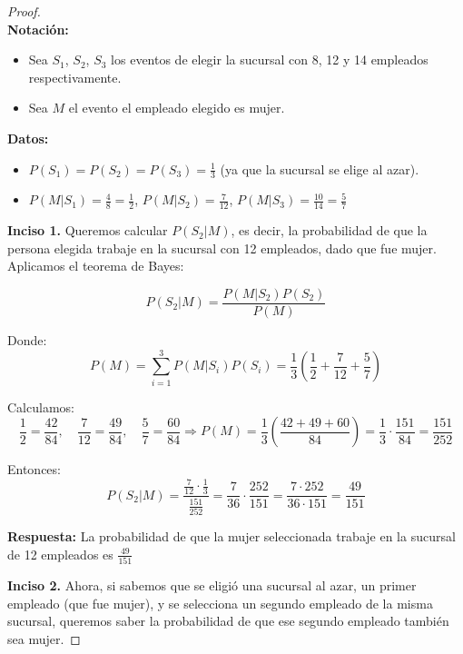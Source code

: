 \documentclass[11pt,letterpaper]{article}
\begin{document}
\begin{proof}\,\\
	\textbf{Notación:}
	\begin{itemize}
	    \item Sea $S_1$, $S_2$, $S_3$ los eventos de elegir la sucursal con 8, 12 y 14 empleados respectivamente.
	    \item Sea $M$ el evento el empleado elegido es mujer.
	\end{itemize}
	
	\textbf{Datos:}
	\begin{itemize}
	    \item $P(S_1) = P(S_2) = P(S_3) = \frac{1}{3}$ (ya que la sucursal se elige al azar).
	    \item $P(M|S_1) = \frac{4}{8} = \frac{1}{2}$,\quad
	          $P(M|S_2) = \frac{7}{12}$,\quad
	          $P(M|S_3) = \frac{10}{14} = \frac{5}{7}$
	\end{itemize}

	\vspace{0.2cm}
	\textbf{Inciso 1.} Queremos calcular \( P(S_2 | M) \), es decir, la probabilidad de que la persona elegida trabaje en la sucursal con 12 empleados, dado que fue mujer. Aplicamos el teorema de Bayes:

	\[
	P(S_2 | M) = \frac{P(M|S_2) P(S_2)}{P(M)}
	\]

	Donde:
	\[
	P(M) = \sum_{i=1}^3 P(M|S_i)P(S_i) 
	= \frac{1}{3}\left(\frac{1}{2} + \frac{7}{12} + \frac{5}{7}\right)
	\]

	Calculamos:
	\[
	\frac{1}{2} = \frac{42}{84},\quad
	\frac{7}{12} = \frac{49}{84},\quad
	\frac{5}{7} = \frac{60}{84}
	\Rightarrow
	P(M) = \frac{1}{3} \left( \frac{42 + 49 + 60}{84} \right) = \frac{1}{3} \cdot \frac{151}{84} = \frac{151}{252}
	\]

	Entonces:
	\[
	P(S_2 | M) = \frac{\frac{7}{12} \cdot \frac{1}{3}}{\frac{151}{252}} 
	= \frac{7}{36} \cdot \frac{252}{151}
	= \frac{7 \cdot 252}{36 \cdot 151}
	= \frac{49}{151}
	\]

	\vspace{0.2cm}
	\textbf{Respuesta:} La probabilidad de que la mujer seleccionada trabaje en la sucursal de 12 empleados es $\frac{49}{151}$

	\vspace{0.4cm}
	\textbf{Inciso 2.} Ahora, si sabemos que se eligió una sucursal al azar, un primer empleado (que fue mujer), y se selecciona un segundo empleado de la misma sucursal, queremos saber la probabilidad de que ese segundo empleado también sea mujer.


\end{proof}
\end{document}
